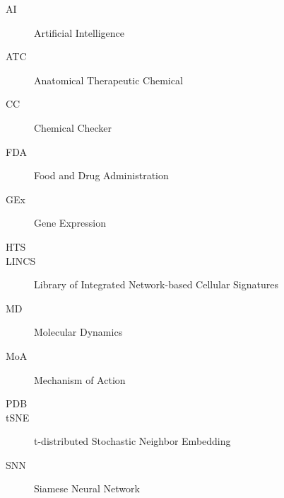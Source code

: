 

\begin{description}
    \item[AI] Artificial Intelligence
    \item[ATC] Anatomical Therapeutic Chemical
    \item[CC] Chemical Checker
    \item[FDA] Food and Drug Administration
    \item[GEx] Gene Expression
    \item[HTS]
    \item[LINCS] Library of Integrated Network-based Cellular Signatures
    \item[MD] Molecular Dynamics
    \item[MoA] Mechanism of Action
    \item[PDB]
    \item[tSNE] t-distributed Stochastic Neighbor Embedding
    \item[SNN] Siamese Neural Network
\end{description}


